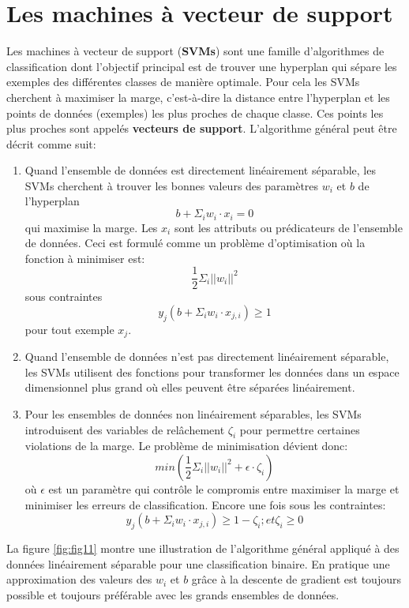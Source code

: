 \section{Les machines à vecteur de support}
\label{chap4.section8}
Les machines à vecteur de support (\textbf{SVMs}) sont une famille d'algorithmes de classification dont l'objectif principal est de trouver une hyperplan qui sépare les exemples des différentes classes de manière optimale. Pour cela les SVMs cherchent à maximiser la marge, c'est-à-dire la distance entre l'hyperplan et les points de données (exemples) les plus proches de chaque classe. Ces points les plus proches sont appelés \textbf{vecteurs de support}. L'algorithme général peut être décrit comme suit:

\begin{enumerate}
    \item Quand l'ensemble de données est directement linéairement séparable, les SVMs cherchent à trouver les bonnes valeurs des paramètres \(w_i\) et \(b\) de l'hyperplan \[b + \Sigma_i w_i \cdot x_i = 0\] qui maximise la marge. Les \(x_i\) sont les attributs ou prédicateurs de l'ensemble de données. Ceci est formulé comme un problème d'optimisation où la fonction à minimiser est: \[\frac{1}{2} \Sigma_i ||w_i||^2\] sous contraintes \[y_j(b + \Sigma_i w_i \cdot x_{j,i}) \geq 1\] pour tout exemple \(x_j\). 
    \item Quand l'ensemble de données n'est pas directement linéairement séparable, les SVMs utilisent des fonctions pour transformer les données dans un espace dimensionnel plus grand où elles peuvent être séparées linéairement.
    \item Pour les ensembles de données non linéairement séparables, les SVMs introduisent des variables de relâchement \(\zeta_i\) pour permettre certaines violations de la marge. Le problème de minimisation dévient donc: \[min(\frac{1}{2} \Sigma_i ||w_i||^2 + \epsilon \cdot \zeta_i)\] où \(\epsilon\) est un paramètre qui contrôle le compromis entre maximiser la marge et minimiser les erreurs de classification. Encore une fois sous les contraintes: \[y_j(b + \Sigma_i w_i \cdot x_{j,i}) \geq 1 - \zeta_i; et \zeta_i \geq 0\]
\end{enumerate}

La figure \ref{fig:fig11} montre une illustration de l'algorithme général appliqué à des données linéairement séparable pour une classification binaire. En pratique une approximation des valeurs des \(w_i\) et \(b\) grâce à la descente de gradient est toujours possible et toujours préférable avec les grands ensembles de données.

